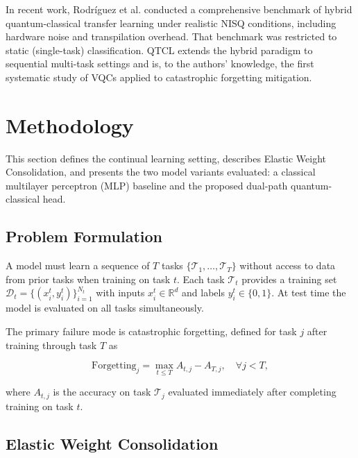 \documentclass[acmlarge]{acmart}
\begin{document}
In recent work, Rodríguez et al. \cite{RODRIGUEZ26} conducted a comprehensive benchmark of hybrid quantum-classical transfer learning under realistic NISQ conditions, including hardware noise and transpilation overhead.
That benchmark was restricted to static (single-task) classification.
QTCL extends the hybrid paradigm to sequential multi-task settings and is, to the authors' knowledge, the first systematic study of VQCs applied to catastrophic forgetting mitigation.

\section{Methodology}
\label{sec:methodology}

This section defines the continual learning setting, describes Elastic Weight Consolidation, and presents the two model variants evaluated: a classical multilayer perceptron (MLP) baseline and the proposed dual-path quantum-classical head.

\subsection{Problem Formulation}
\label{subsec:problem_formulation}

A model must learn a sequence of $T$ tasks $\{\mathcal{T}_1, \ldots, \mathcal{T}_T\}$ without access to data from prior tasks when training on task $t$.
Each task $\mathcal{T}_t$ provides a training set $\mathcal{D}_t = \{(x_i^t, y_i^t)\}_{i=1}^{N_t}$ with inputs $x_i^t \in \mathbb{R}^d$ and labels $y_i^t \in \{0, 1\}$.
At test time the model is evaluated on all tasks simultaneously.

The primary failure mode is catastrophic forgetting, defined for task $j$ after training through task $T$ as

\begin{equation}
\label{eq:forgetting}
\text{Forgetting}_j = \max_{t \leq T} A_{t,j} - A_{T,j}, \quad \forall j < T,
\end{equation}

where $A_{t,j}$ is the accuracy on task $\mathcal{T}_j$ evaluated immediately after completing training on task $t$.

\subsection{Elastic Weight Consolidation}
\label{subsec:ewc}
\end{document}

